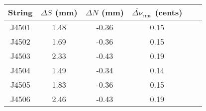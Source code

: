 \begin{tabular}{cccccc}
\toprule
String & $\Delta S$ (mm) & $\Delta N$ (mm) & $\overline{\Delta \nu}_\text{rms}$ (cents) \\
\midrule
J4501 & 1.48 & -0.36 & 0.15 \\
J4502 & 1.69 & -0.36 & 0.15 \\
J4503 & 2.33 & -0.43 & 0.19 \\
J4504 & 1.49 & -0.34 & 0.14 \\
J4505 & 1.83 & -0.36 & 0.15 \\
J4506 & 2.46 & -0.43 & 0.19 \\
\bottomrule
\end{tabular}

